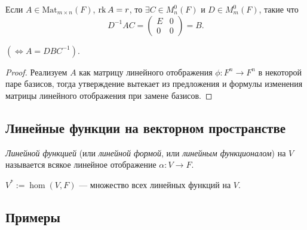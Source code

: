 \begin{corollary}
    Если $A \in \text{Mat}_{m \times n}(F)$, $\operatorname{\mathop{\mathrm{rk}}} A = r$, то $\exists C \in M_n^{0}(F)$ и $D \in M_m^{0}(F)$, такие что
    \begin{equation*}
        D^{-1}AC = \left(
            \begin{array}{c|c}
                E & 0 \\
                \hline
                0 & 0
            \end{array}
        \right) = B
    .\end{equation*}

    $(\iff A = DBC^{-1})$.
\end{corollary}

\begin{proof}
    Реализуем $A$ как матрицу линейного отображения $\phi : F^{n} \to F^n$ в некоторой паре базисов, тогда утверждение вытекает из предложения и формулы изменения матрицы линейного отображения при замене базисов.
\end{proof}


\subsection{Линейные функции на векторном пространстве}

\begin{definition}
    \textit{Линейной функцией} (или \textit{линейной формой}, или \textit{линейным функционалом}) на $V$ называется всякое линейное отображение $\alpha : V \to F$.
\end{definition}

\begin{designation}
    $V^{*} := \hom(V, F)$ --- множество всех линейных функций на $V$.
\end{designation}


\subsection{Примеры}

